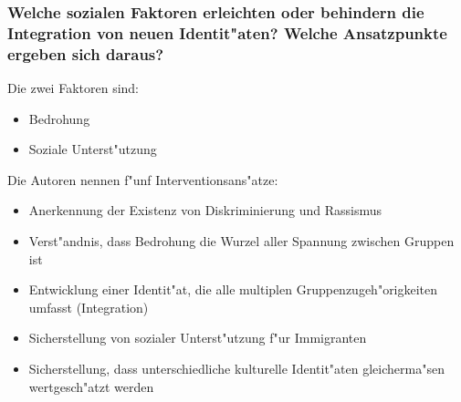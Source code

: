 \subsubsection{Welche sozialen Faktoren erleichten oder behindern die Integration von neuen Identit"aten? Welche Ansatzpunkte ergeben sich daraus?}
Die zwei Faktoren sind:
\begin{itemize}
        \item Bedrohung
        \item Soziale Unterst"utzung
\end{itemize}

\noindent Die Autoren nennen f"unf Interventionsans"atze:
\begin{itemize}
        \item Anerkennung der Existenz von Diskriminierung und Rassismus
        \item Verst"andnis, dass Bedrohung die Wurzel aller Spannung zwischen Gruppen ist
        \item Entwicklung einer Identit"at, die alle multiplen Gruppenzugeh"origkeiten umfasst (Integration)
        \item Sicherstellung von sozialer Unterst"utzung f"ur Immigranten
        \item Sicherstellung, dass unterschiedliche kulturelle Identit"aten gleicherma"sen wertgesch"atzt werden
\end{itemize}


